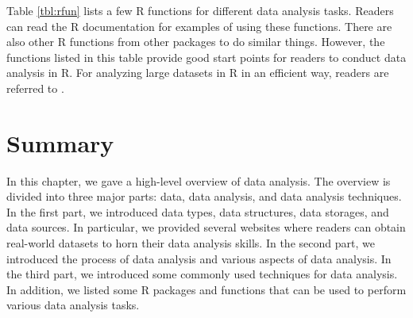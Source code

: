 \documentclass[12pt]{article}
\begin{document}
Table \ref{tbl:rfun} lists a few R functions for different data analysis tasks. Readers can read the R documentation for examples of using these functions. There are also other R functions from other packages to do similar things. However, the functions listed in this table provide good start points for readers to conduct data analysis in R. For analyzing large datasets in R in an efficient way, readers are referred to \citep{daroczi2015}. 


\section{Summary}

In this chapter, we gave a high-level overview of data analysis. The overview is divided into three major parts: data, data analysis, and data analysis techniques. In the first part, we introduced data types, data structures, data storages, and data sources. In particular, we provided several websites where readers can obtain real-world datasets to horn their data analysis skills. In the second part, we introduced the process of data analysis and various aspects of data analysis. In the third part, we introduced some commonly used techniques for data analysis. In addition, we listed some R packages and functions that can be used to perform various data analysis tasks. 



\end{document}
